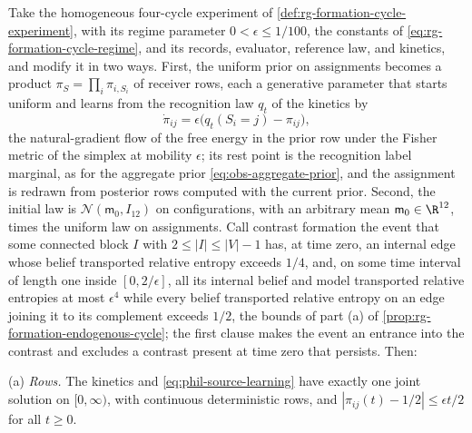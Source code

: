 Take the homogeneous four-cycle experiment of
\cref{def:rg-formation-cycle-experiment}, with its regime parameter
\(0<\epsilon\le1/100\), the constants of \cref{eq:rg-formation-cycle-regime},
and its records, evaluator, reference law, and kinetics, and modify it in two
ways. First, the uniform prior on assignments becomes a product
\(\pi_S=\prod_i\pi_{i,S_i}\) of receiver rows, each a generative parameter that
starts uniform and learns from the recognition law \(q_t\) of the kinetics by
\begin{equation}
\dot\pi_{ij}=\epsilon\bigl(q_t(S_i=j)-\pi_{ij}\bigr),
\label{eq:phil-source-learning}
\end{equation}
the natural-gradient flow of the free energy in the prior row under the Fisher
metric of the simplex at mobility \(\epsilon\); its rest point is the recognition
label marginal, as for the aggregate prior \eqref{eq:obs-aggregate-prior}, and the
assignment is redrawn from posterior rows computed with the current prior.
Second, the initial law is \(\mathcal N(\mathsf m_0,I_{12})\) on configurations,
with an arbitrary mean \(\mathsf m_0\in\R^{12}\), times the uniform law on
assignments. Call contrast formation the event that some connected block \(I\)
with \(2\le|I|\le|V|-1\) has, at time zero, an internal edge whose belief
transported relative entropy exceeds \(1/4\), and, on some time interval of
length one inside \([0,2/\epsilon]\), all its internal belief and model
transported relative entropies at most \(\epsilon^4\) while every belief
transported relative entropy on an edge joining it to its complement exceeds
\(1/2\), the bounds of part (a) of \cref{prop:rg-formation-endogenous-cycle};
the first clause makes the event an entrance into the contrast and excludes a
contrast present at time zero that persists. Then:

(a) \emph{Rows.} The kinetics and \cref{eq:phil-source-learning} have exactly
one joint solution on \([0,\infty)\), with continuous deterministic rows, and
\(|\pi_{ij}(t)-1/2|\le\epsilon t/2\) for all \(t\ge0\).

